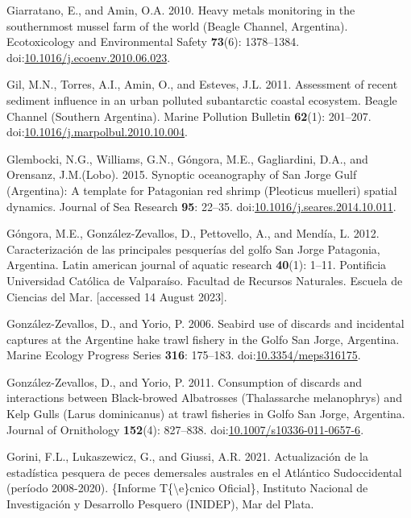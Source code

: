 \documentclass[
]{article}
\newlength{\cslhangindent}
\newenvironment{CSLReferences}[2] %
 {\begin{list}{}{%
  \setlength{\itemindent}{0pt}
  \setlength{\leftmargin}{0pt}
  \setlength{\parsep}{0pt}
  \ifodd #1
   \setlength{\leftmargin}{\cslhangindent}
   \setlength{\itemindent}{-1\cslhangindent}
  \fi
  \setlength{\itemsep}{#2\baselineskip}}}
 {\end{list}}
\begin{document}
\begin{CSLReferences}{1}{0}
Giarratano, E., and Amin, O.A. 2010. Heavy metals monitoring in the
southernmost mussel farm of the world ({Beagle Channel}, {Argentina}).
Ecotoxicology and Environmental Safety \textbf{73}(6): 1378--1384.
doi:\href{https://doi.org/10.1016/j.ecoenv.2010.06.023}{10.1016/j.ecoenv.2010.06.023}.

Gil, M.N., Torres, A.I., Amin, O., and Esteves, J.L. 2011. Assessment of
recent sediment influence in an urban polluted subantarctic coastal
ecosystem. {Beagle Channel} ({Southern Argentina}). Marine Pollution
Bulletin \textbf{62}(1): 201--207.
doi:\href{https://doi.org/10.1016/j.marpolbul.2010.10.004}{10.1016/j.marpolbul.2010.10.004}.

Glembocki, N.G., Williams, G.N., Góngora, M.E., Gagliardini, D.A., and
Orensanz, J.M.(Lobo). 2015. Synoptic oceanography of {San Jorge Gulf}
({Argentina}): {A} template for {Patagonian} red shrimp ({Pleoticus}
muelleri) spatial dynamics. Journal of Sea Research \textbf{95}: 22--35.
doi:\href{https://doi.org/10.1016/j.seares.2014.10.011}{10.1016/j.seares.2014.10.011}.

Góngora, M.E., González-Zevallos, D., Pettovello, A., and Mendía, L.
2012. Caracterizaci{ó}n de las principales pesquer{í}as del golfo {San
Jorge Patagonia}, {Argentina}. Latin american journal of aquatic
research \textbf{40}(1): 1--11. Pontificia Universidad Cat{ó}lica de
Valpara{í}so. Facultad de Recursos Naturales. Escuela de Ciencias del
Mar. {[}accessed 14 August 2023{]}.

González-Zevallos, D., and Yorio, P. 2006. Seabird use of discards and
incidental captures at the {Argentine} hake trawl fishery in the {Golfo
San Jorge}, {Argentina}. Marine Ecology Progress Series \textbf{316}:
175--183.
doi:\href{https://doi.org/10.3354/meps316175}{10.3354/meps316175}.

González-Zevallos, D., and Yorio, P. 2011. Consumption of discards and
interactions between {Black-browed Albatrosses} ({Thalassarche}
melanophrys) and {Kelp Gulls} ({Larus} dominicanus) at trawl fisheries
in {Golfo San Jorge}, {Argentina}. Journal of Ornithology
\textbf{152}(4): 827--838.
doi:\href{https://doi.org/10.1007/s10336-011-0657-6}{10.1007/s10336-011-0657-6}.

Gorini, F.L., Lukaszewicz, G., and Giussi, A.R. 2021. {Actualizaci{ó}n
de la estad{í}stica pesquera de peces demersales australes en el
Atl{á}ntico Sudoccidental (per{í}odo 2008-2020)}. \{Informe
T\{\textbackslash\textquotesingle e\}cnico Oficial\}, Instituto Nacional
de Investigaci{ó}n y Desarrollo Pesquero (INIDEP), Mar del Plata.


\end{CSLReferences}
\end{document}
